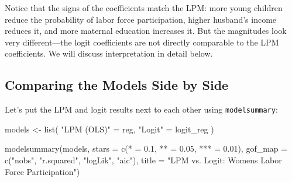 \documentclass[
  letterpaper,
  DIV=11,
  numbers=noendperiod]{scrreprt}
\newenvironment{Shaded}{\begin{snugshade}}{\end{snugshade}}
\newcommand{\AttributeTok}[1]{\textcolor[rgb]{0.40,0.45,0.13}{#1}}
\newcommand{\FloatTok}[1]{\textcolor[rgb]{0.68,0.00,0.00}{#1}}
\newcommand{\FunctionTok}[1]{\textcolor[rgb]{0.28,0.35,0.67}{#1}}
\newcommand{\NormalTok}[1]{\textcolor[rgb]{0.00,0.23,0.31}{#1}}
\newcommand{\OtherTok}[1]{\textcolor[rgb]{0.00,0.23,0.31}{#1}}
\newcommand{\StringTok}[1]{\textcolor[rgb]{0.13,0.47,0.30}{#1}}
\begin{document}
Notice that the signs of the coefficients match the LPM: more young
children reduce the probability of labor force participation, higher
husband's income reduces it, and more maternal education increases it.
But the magnitudes look very different---the logit coefficients are not
directly comparable to the LPM coefficients. We will discuss
interpretation in detail below.

\subsection{Comparing the Models Side by
Side}\label{comparing-the-models-side-by-side}

Let's put the LPM and logit results next to each other using
\texttt{modelsummary}:

\begin{Shaded}
\begin{Highlighting}[]
\NormalTok{models }\OtherTok{\textless{}{-}} \FunctionTok{list}\NormalTok{(}
    \StringTok{"LPM (OLS)"} \OtherTok{=}\NormalTok{ reg,}
    \StringTok{"Logit"} \OtherTok{=}\NormalTok{ logit\_reg}
\NormalTok{)}

\FunctionTok{modelsummary}\NormalTok{(models,}
             \AttributeTok{stars =} \FunctionTok{c}\NormalTok{(}\StringTok{\textquotesingle{}*\textquotesingle{}} \OtherTok{=} \FloatTok{0.1}\NormalTok{, }\StringTok{\textquotesingle{}**\textquotesingle{}} \OtherTok{=} \FloatTok{0.05}\NormalTok{, }\StringTok{\textquotesingle{}***\textquotesingle{}} \OtherTok{=} \FloatTok{0.01}\NormalTok{),}
             \AttributeTok{gof\_map =} \FunctionTok{c}\NormalTok{(}\StringTok{"nobs"}\NormalTok{, }\StringTok{"r.squared"}\NormalTok{, }\StringTok{"logLik"}\NormalTok{, }\StringTok{"aic"}\NormalTok{),}
             \AttributeTok{title =} \StringTok{"LPM vs. Logit: Women\textquotesingle{}s Labor Force Participation"}\NormalTok{)}
\end{Highlighting}
\end{Shaded}
\end{document}
